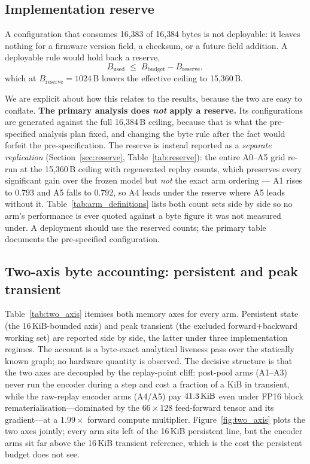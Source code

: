 \subsection{Implementation reserve}

A configuration that consumes 16{,}383 of 16{,}384 bytes is not deployable: it
leaves nothing for a firmware version field, a checksum, or a future field
addition. A deployable rule would hold back a reserve,
\[
B_{\mathrm{used}} \;\le\; B_{\mathrm{budget}} - B_{\mathrm{reserve}},
\]
which at $B_{\mathrm{reserve}} = 1024$\,B lowers the effective ceiling to
15{,}360\,B.

We are explicit about how this relates to the results, because the two are easy
to conflate. \textbf{The primary analysis does \emph{not} apply a reserve.} Its
configurations are generated against the full 16{,}384\,B ceiling, because that
is what the pre-specified analysis plan fixed, and changing the byte rule after
the fact would forfeit the pre-specification. The reserve is instead reported as
a \emph{separate replication} (Section~\ref{sec:reserve},
Table~\ref{tab:reserve}): the entire A0--A5 grid re-run at the 15{,}360\,B
ceiling with regenerated replay counts, which preserves every significant gain
over the frozen model but \emph{not} the exact arm ordering --- A1 rises to
$0.793$ and A5 falls to $0.792$, so A4 leads under the reserve where A5 leads
without it. Table~\ref{tab:arm_definitions} lists both count sets side
by side so no arm's performance is ever quoted against a byte figure it was not
measured under. A deployment should use the reserved counts; the primary table
documents the pre-specified configuration.

\subsection{Two-axis byte accounting: persistent and peak transient}

Table~\ref{tab:two_axis} itemises both memory axes for every arm.
Persistent state (the 16\,KiB-bounded axis) and peak transient (the excluded
forward+backward working set) are reported side by side, the latter under three
implementation regimes. The account is a byte-exact analytical liveness pass
over the statically known graph; no hardware quantity is observed. The
decisive structure is that the two axes are decoupled by the replay-point cliff:
post-pool arms (A1--A3) never run the encoder during a step and cost a fraction
of a KiB in transient, while the raw-replay encoder arms (A4/A5) pay
$41.3\,\mathrm{KiB}$ even under FP16 block rematerialisation---dominated by the
$66\times128$ feed-forward tensor and its gradient---at a $1.99\times$ forward
compute multiplier. Figure~\ref{fig:two_axis} plots the two axes jointly; every
arm sits left of the 16\,KiB persistent line, but the encoder arms sit far above
the 16\,KiB transient reference, which is the cost the persistent budget does not
see.

